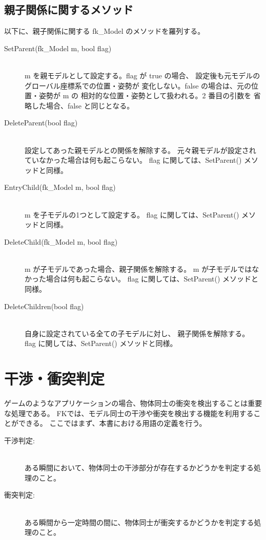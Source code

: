 \subsection{親子関係に関するメソッド} 
以下に、親子関係に関する fk\_Model のメソッドを羅列する。
\begin{description}
\item[SetParent(fk\_Model m, bool flag)] ~ \\
	m を親モデルとして設定する。flag が true の場合、
	設定後も元モデルのグローバル座標系での位置・姿勢が
	変化しない。false の場合は、元の位置・姿勢が m の
	相対的な位置・姿勢として扱われる。2 番目の引数を
	省略した場合、false と同じとなる。\\

\item[DeleteParent(bool flag)] ~ \\
	設定してあった親モデルとの関係を解除する。
	元々親モデルが設定されていなかった場合は何も起こらない。
	flag に関しては、SetParent() メソッドと同様。\\

\item[EntryChild(fk\_Model m, bool flag)] ~ \\
	m を子モデルの1つとして設定する。
	flag に関しては、SetParent() メソッドと同様。\\

\item[DeleteChild(fk\_Model m, bool flag)] ~ \\
	m が子モデルであった場合、親子関係を解除する。
	m が子モデルではなかった場合は何も起こらない。
	flag に関しては、SetParent() メソッドと同様。\\

\item[DeleteChildren(bool flag)] ~ \\
	自身に設定されている全ての子モデルに対し、
	親子関係を解除する。
	flag に関しては、SetParent() メソッドと同様。

\end{description}

\section{干渉・衝突判定}
ゲームのようなアプリケーションの場合、物体同士の衝突を検出することは重要な処理である。
FKでは、モデル同士の干渉や衝突を検出する機能を利用することができる。
ここではまず、本書における用語の定義を行う。
\begin{description}
 \item[干渉判定:] ~ \\
	ある瞬間において、物体同士の干渉部分が存在するかどうかを判定する処理のこと。

 \item[衝突判定:] ~ \\
	ある瞬間から一定時間の間に、物体同士が衝突するかどうかを判定する処理のこと。
\end{description}

